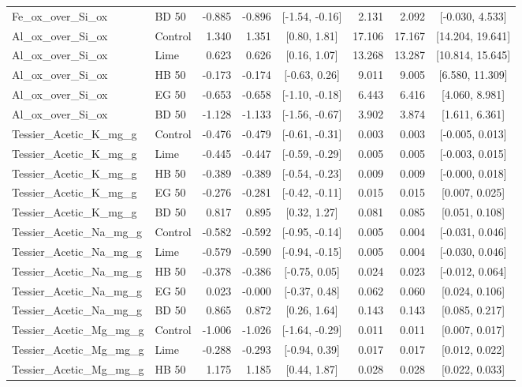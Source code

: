 \documentclass[preprint,12pt]{elsarticle}
\begin{document}
\begin{landscape}
\begin{longtable}{@{} >{\raggedright\arraybackslash}p{4.3cm} l r r c r r c @{}}
Fe\_ox\_over\_Si\_ox & BD 50 & -0.885 & -0.896 & [-1.54, -0.16] & 2.131 & 2.092 & [-0.030, 4.533] \\
Al\_ox\_over\_Si\_ox & Control & 1.340 & 1.351 & [0.80, 1.81] & 17.106 & 17.167 & [14.204, 19.641] \\
Al\_ox\_over\_Si\_ox & Lime & 0.623 & 0.626 & [0.16, 1.07] & 13.268 & 13.287 & [10.814, 15.645] \\
Al\_ox\_over\_Si\_ox & HB 50 & -0.173 & -0.174 & [-0.63, 0.26] & 9.011 & 9.005 & [6.580, 11.309] \\
Al\_ox\_over\_Si\_ox & EG 50 & -0.653 & -0.658 & [-1.10, -0.18] & 6.443 & 6.416 & [4.060, 8.981] \\
Al\_ox\_over\_Si\_ox & BD 50 & -1.128 & -1.133 & [-1.56, -0.67] & 3.902 & 3.874 & [1.611, 6.361] \\
Tessier\_Acetic\_K\_mg\_g & Control & -0.476 & -0.479 & [-0.61, -0.31] & 0.003 & 0.003 & [-0.005, 0.013] \\
Tessier\_Acetic\_K\_mg\_g & Lime & -0.445 & -0.447 & [-0.59, -0.29] & 0.005 & 0.005 & [-0.003, 0.015] \\
Tessier\_Acetic\_K\_mg\_g & HB 50 & -0.389 & -0.389 & [-0.54, -0.23] & 0.009 & 0.009 & [-0.000, 0.018] \\
Tessier\_Acetic\_K\_mg\_g & EG 50 & -0.276 & -0.281 & [-0.42, -0.11] & 0.015 & 0.015 & [0.007, 0.025] \\
Tessier\_Acetic\_K\_mg\_g & BD 50 & 0.817 & 0.895 & [0.32, 1.27] & 0.081 & 0.085 & [0.051, 0.108] \\
Tessier\_Acetic\_Na\_mg\_g & Control & -0.582 & -0.592 & [-0.95, -0.14] & 0.005 & 0.004 & [-0.031, 0.046] \\
Tessier\_Acetic\_Na\_mg\_g & Lime & -0.579 & -0.590 & [-0.94, -0.15] & 0.005 & 0.004 & [-0.030, 0.046] \\
Tessier\_Acetic\_Na\_mg\_g & HB 50 & -0.378 & -0.386 & [-0.75, 0.05] & 0.024 & 0.023 & [-0.012, 0.064] \\
Tessier\_Acetic\_Na\_mg\_g & EG 50 & 0.023 & -0.000 & [-0.37, 0.48] & 0.062 & 0.060 & [0.024, 0.106] \\
Tessier\_Acetic\_Na\_mg\_g & BD 50 & 0.865 & 0.872 & [0.26, 1.64] & 0.143 & 0.143 & [0.085, 0.217] \\
Tessier\_Acetic\_Mg\_mg\_g & Control & -1.006 & -1.026 & [-1.64, -0.29] & 0.011 & 0.011 & [0.007, 0.017] \\
Tessier\_Acetic\_Mg\_mg\_g & Lime & -0.288 & -0.293 & [-0.94, 0.39] & 0.017 & 0.017 & [0.012, 0.022] \\
Tessier\_Acetic\_Mg\_mg\_g & HB 50 & 1.175 & 1.185 & [0.44, 1.87] & 0.028 & 0.028 & [0.022, 0.033] \\

\end{longtable}
\end{landscape}
\end{document}
